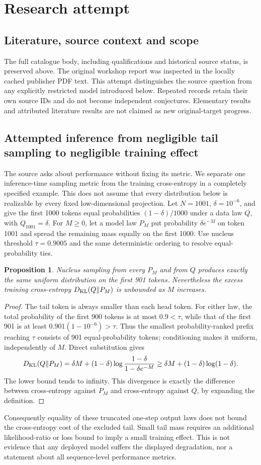 \documentclass[11pt]{article}
\newtheorem{proposition}{Proposition}
\begin{document}
\section{Research attempt}
\subsection{Literature, source context and scope}
The full catalogue body, including qualifications and historical source status, is preserved above. The original workshop report was inspected in the locally cached publisher PDF text. This attempt distinguishes the source question from any explicitly restricted model introduced below. Repeated records retain their own source IDs and do not become independent conjectures. Elementary results and attributed literature results are not claimed as new original-target progress.

\subsection{Attempted inference from negligible tail sampling to negligible training effect}
The source asks about performance without fixing its metric. We separate one inference-time sampling metric from the training cross-entropy in a completely specified example. This does not assume that every distribution below is realizable by every fixed low-dimensional projection.
Let $N=1001$, $\delta=10^{-6}$, and give the first 1000 tokens equal probabilities $(1-\delta)/1000$ under a data law $Q$, with $Q_{1001}=\delta$. For $M\ge0$, let a model law $P_M$ put probability $\delta e^{-M}$ on token 1001 and spread the remaining mass equally on the first 1000. Use nucleus threshold $\tau=0.9005$ and the same deterministic ordering to resolve equal-probability ties.
\begin{proposition}
Nucleus sampling from every $P_M$ and from $Q$ produces exactly the same uniform distribution on the first 901 tokens. Nevertheless the excess training cross-entropy $D_{\rm KL}(Q\|P_M)$ is unbounded as $M$ increases.
\end{proposition}
\begin{proof}
The tail token is always smaller than each head token. For either law, the total probability of the first 900 tokens is at most $0.9<\tau$, while that of the first 901 is at least $0.901(1-10^{-6})>\tau$. Thus the smallest probability-ranked prefix reaching $\tau$ consists of 901 equal-probability tokens; conditioning makes it uniform, independently of $M$.
Direct substitution gives
\[
 D_{\rm KL}(Q\|P_M)
 =\delta M+(1-\delta)\log\frac{1-\delta}{1-\delta e^{-M}}
 \ge\delta M+(1-\delta)\log(1-\delta).
\]
The lower bound tends to infinity. This divergence is exactly the difference between cross-entropy against $P_M$ and cross-entropy against $Q$, by expanding the definition.
\end{proof}
Consequently equality of these truncated one-step output laws does not bound the cross-entropy cost of the excluded tail. Small tail mass requires an additional likelihood-ratio or loss bound to imply a small training effect. This is not evidence that any deployed model suffers the displayed degradation, nor a statement about all sequence-level performance metrics.
\end{document}
